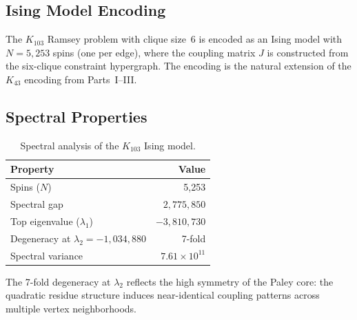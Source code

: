 \documentclass[11pt,a4paper]{article}
\theoremstyle{plain}
\theoremstyle{remark}
\begin{document}
\subsection{Ising Model Encoding}

The $K_{103}$ Ramsey problem with clique size~6 is encoded as an
Ising model with $N = 5{,}253$ spins (one per edge), where the
coupling matrix $J$ is constructed from the six-clique constraint
hypergraph. The encoding is the natural extension of the
$K_{43}$ encoding from Parts~I--III.

\subsection{Spectral Properties}

\begin{table}[H]
\centering
\caption{Spectral analysis of the $K_{103}$ Ising model.}
\label{tab:spectral}
\small
\begin{tabular}{@{}lr@{}}
\toprule
\textbf{Property} & \textbf{Value} \\
\midrule
Spins ($N$) & 5{,}253 \\
Spectral gap & $2{,}775{,}850$ \\
Top eigenvalue ($\lambda_1$) & $-3{,}810{,}730$ \\
Degeneracy at $\lambda_2 = -1{,}034{,}880$ & 7-fold \\
Spectral variance & $7.61 \times 10^{11}$ \\
\bottomrule
\end{tabular}
\end{table}

The 7-fold degeneracy at $\lambda_2$ reflects the high symmetry of
the Paley core: the quadratic residue structure induces near-identical
coupling patterns across multiple vertex neighborhoods.
\end{document}
